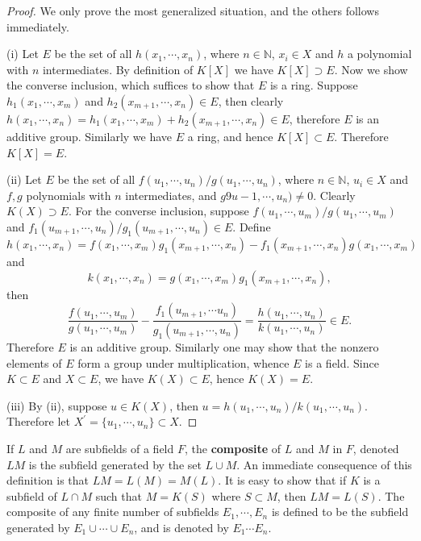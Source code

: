 \begin{proof}
We only prove the most generalized situation, and the others follows immediately.\par
(i) Let $E$ be the set of all $h(x_1,\cdots,x_n)$, where $n\in\mathbb{N}$, $x_i\in X$ and $h$ a polynomial with $n$ intermediates. By definition of $K[X]$ we have $K[X]\supset E$. Now we show the converse inclusion, which suffices to show that $E$ is a ring. Suppose $h_1(x_1,\cdots,x_m)$ and $h_2(x_{m+1},\cdots,x_n)\in E$, then clearly $h(x_1,\cdots,x_n)=h_1(x_1,\cdots,x_m)+h_2(x_{m+1},\cdots,x_n)\in E$, therefore $E$ is an additive group. Similarly we have $E$ a ring, and hence $K[X]\subset E$. Therefore $K[X]=E$.\par
(ii) Let $E$ be the set of all $f(u_1,\cdots,u_n)/g(u_1,\cdots,u_n)$, where $n\in\mathbb{N}$, $u_i\in X$ and $f,g$ polynomials with $n$ intermediates, and $g9u-1,\cdots,u_n)\ne 0$. Clearly $K(X)\supset E$. For the converse inclusion, suppose $f(u_1,\cdots,u_m)/g(u_1,\cdots,u_m)$ and $f_1(u_{m+1},\cdots,u_n)/g_1(u_{m+1},\cdots,u_n)\in E$. Define 
$$
h\left( x_1,\cdots ,x_n \right) =f\left( x_1,\cdots ,x_m \right) g_1\left( x_{m+1},\cdots ,x_n \right) -f_1\left( x_{m+1},\cdots ,x_n \right) g\left( x_1,\cdots ,x_m \right) 
$$
and 
$$
k\left( x_1,\cdots ,x_n \right) =g\left( x_1,\cdots ,x_m \right) g_1\left( x_{m+1},\cdots ,x_n \right) ,
$$
then 
$$
\frac{f\left( u_1,\cdots ,u_m \right)}{g\left( u_1,\cdots ,u_m \right)}-\frac{f_1\left( u_{m+1},\cdots u_n \right)}{g_1\left( u_{m+1},\cdots ,u_n \right)}=\frac{h\left( u_1,\cdots ,u_n \right)}{k\left( u_1,\cdots ,u_n \right)}\in E.
$$
Therefore $E$ is an additive group. Similarly one may show that the nonzero elements of $E$ form a group under multiplication, whence $E$ is a field. Since $K\subset E$ and $X\subset E$, we have $K(X)\subset E$, hence $K(X)=E$.\par
(iii) By (ii), suppose $u\in K(X)$, then $u=h(u_1,\cdots,u_n)/k(u_1,\cdots,u_n)$. Therefore let $X^\prime=\{u_1,\cdots,u_n\}\subset X$.
\end{proof}
If $L$ and $M$ are subfields of a field $F$, the \textbf{composite} of $L$ and $M$ in $F$, denoted $LM$ is the subfield generated by the set $L\cup M$. An immediate consequence of this definition is that $LM=L(M)=M(L)$. It is easy to show that if $K$ is a subfield of $L\cap M$ such that $M=K(S)$ where $S\subset M$, then $LM=L(S)$. The composite of any finite number of subfields $E_1,\cdots,E_n$ is defined to be the subfield generated by $E_1\cup\cdots\cup E_n$, and is denoted by $E_1\cdots E_n$.\par
